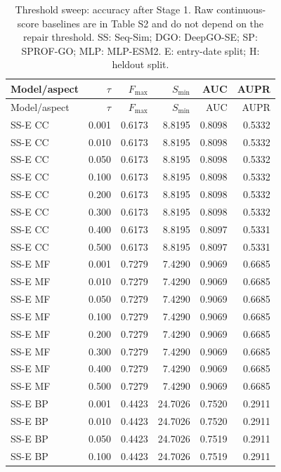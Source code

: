 \begingroup\scriptsize
\setlength{\tabcolsep}{4pt}
\begin{longtable}{lrrrrr}
\caption{Threshold sweep: accuracy after Stage 1. Raw continuous-score baselines are in Table S2 and do not depend on the repair threshold. SS: Seq-Sim; DGO: DeepGO-SE; SP: SPROF-GO; MLP: MLP-ESM2. E: entry-date split; H: heldout split.}\label{tab:supp-threshold-metrics}\\
\toprule
Model/aspect & $\tau$ & $F_{\max}$ & $S_{\min}$ & AUC & AUPR \\
\midrule
\endfirsthead
\toprule
Model/aspect & $\tau$ & $F_{\max}$ & $S_{\min}$ & AUC & AUPR \\
\midrule
\endhead
SS-E CC & 0.001 & 0.6173 & 8.8195 & 0.8098 & 0.5332 \\
SS-E CC & 0.010 & 0.6173 & 8.8195 & 0.8098 & 0.5332 \\
SS-E CC & 0.050 & 0.6173 & 8.8195 & 0.8098 & 0.5332 \\
SS-E CC & 0.100 & 0.6173 & 8.8195 & 0.8098 & 0.5332 \\
SS-E CC & 0.200 & 0.6173 & 8.8195 & 0.8098 & 0.5332 \\
SS-E CC & 0.300 & 0.6173 & 8.8195 & 0.8098 & 0.5332 \\
SS-E CC & 0.400 & 0.6173 & 8.8195 & 0.8097 & 0.5331 \\
SS-E CC & 0.500 & 0.6173 & 8.8195 & 0.8097 & 0.5331 \\
SS-E MF & 0.001 & 0.7279 & 7.4290 & 0.9069 & 0.6685 \\
SS-E MF & 0.010 & 0.7279 & 7.4290 & 0.9069 & 0.6685 \\
SS-E MF & 0.050 & 0.7279 & 7.4290 & 0.9069 & 0.6685 \\
SS-E MF & 0.100 & 0.7279 & 7.4290 & 0.9069 & 0.6685 \\
SS-E MF & 0.200 & 0.7279 & 7.4290 & 0.9069 & 0.6685 \\
SS-E MF & 0.300 & 0.7279 & 7.4290 & 0.9069 & 0.6685 \\
SS-E MF & 0.400 & 0.7279 & 7.4290 & 0.9069 & 0.6685 \\
SS-E MF & 0.500 & 0.7279 & 7.4290 & 0.9069 & 0.6685 \\
SS-E BP & 0.001 & 0.4423 & 24.7026 & 0.7520 & 0.2911 \\
SS-E BP & 0.010 & 0.4423 & 24.7026 & 0.7520 & 0.2911 \\
SS-E BP & 0.050 & 0.4423 & 24.7026 & 0.7519 & 0.2911 \\
SS-E BP & 0.100 & 0.4423 & 24.7026 & 0.7519 & 0.2911 \\

\end{longtable}
